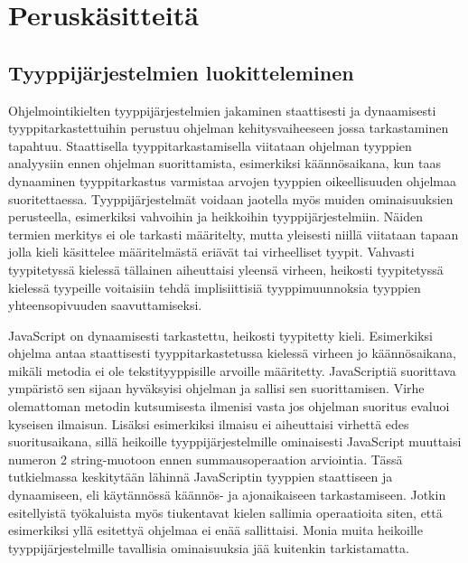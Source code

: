 \chapter{Peruskäsitteitä}

\section{Tyyppijärjestelmien luokitteleminen}
Ohjelmointikielten tyyppijärjestelmien jakaminen staattisesti ja dynaamisesti
tyyppitarkastettuihin perustuu ohjelman kehitysvaiheeseen jossa tarkastaminen
tapahtuu. Staattisella tyyppitarkastamisella viitataan ohjelman tyyppien
analyysiin ennen ohjelman suorittamista, esimerkiksi käännösaikana, kun taas
dynaaminen tyyppitarkastus varmistaa arvojen tyyppien oikeellisuuden ohjelmaa
suoritettaessa. Tyyppijärjestelmät voidaan jaotella myös muiden
ominaisuuksien perusteella, esimerkiksi vahvoihin ja heikkoihin
tyyppijärjestelmiin. Näiden termien merkitys ei ole tarkasti määritelty,
mutta yleisesti niillä viitataan tapaan jolla kieli käsittelee määritelmästä
eriävät tai virheelliset tyypit\cite{CornellTransitionToOO}. Vahvasti
tyypitetyssä kielessä tällainen aiheuttaisi yleensä virheen, heikosti
tyypitetyssä kielessä tyypeille voitaisiin tehdä implisiittisiä
tyyppimuunnoksia tyyppien yhteensopivuuden saavuttamiseksi.

JavaScript on dynaamisesti tarkastettu, heikosti tyypitetty kieli.
Esimerkiksi ohjelma  antaa
staattisesti tyyppitarkastetussa kielessä virheen jo käännösaikana, mikäli
metodia  ei ole tekstityyppisille arvoille määritetty.
JavaScriptiä suorittava ympäristö sen sijaan hyväksyisi ohjelman ja sallisi
sen suorittamisen. Virhe olemattoman metodin kutsumisesta ilmenisi vasta jos
ohjelman suoritus evaluoi kyseisen ilmaisun. Lisäksi esimerkiksi ilmaisu
 ei aiheuttaisi virhettä edes
suoritusaikana, sillä heikoille tyyppijärjestelmille ominaisesti JavaScript
muuttaisi numeron 2 string-muotoon ennen summausoperaation arviointia. Tässä
tutkielmassa keskitytään lähinnä JavaScriptin tyyppien staattiseen ja
dynaamiseen, eli käytännössä käännös- ja ajonaikaiseen tarkastamiseen. Jotkin
esitellyistä työkaluista myös tiukentavat kielen sallimia operaatioita siten,
että esimerkiksi yllä esitettyä  ohjelmaa
ei enää sallittaisi. Monia muita heikoille tyyppijärjestelmille
tavallisia ominaisuuksia jää kuitenkin tarkistamatta.

